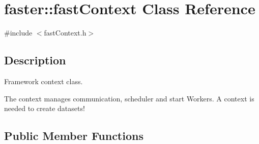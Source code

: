 \hypertarget{classfaster_1_1fastContext}{}\section{faster\+:\+:fast\+Context Class Reference}
\label{classfaster_1_1fastContext}


{\ttfamily \#include $<$fast\+Context.\+h$>$}



\subsection{Description}
Framework context class. 

The context manages communication, scheduler and start Workers. A context is needed to create datasets! \subsection*{Public Member Functions}

